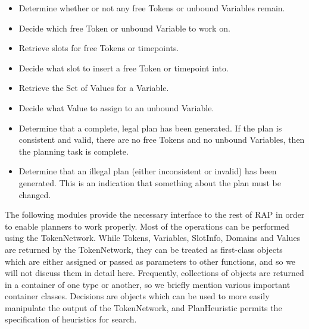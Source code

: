\begin{itemize}
    \item Determine whether or not any free Tokens or unbound Variables remain.
    \item Decide which free Token or unbound Variable to work on.
    \item Retrieve slots for free Tokens or timepoints.
    \item Decide what slot to insert a free Token or timepoint into.
    \item Retrieve the Set of Values for a Variable.
    \item Decide what Value to assign to an unbound Variable.
    \item Determine that a complete, legal plan has been generated.  If the plan is 
    consistent and valid, there are no free Tokens and no unbound Variables,
    then the planning task is complete.
    \item Determine that an illegal plan (either inconsistent or invalid) has been
    generated.  This is an indication that something about the plan must be changed.
\end{itemize}

The following modules provide the necessary interface to the rest of
RAP in order to enable planners to work properly.  Most of the
operations can be performed using the TokenNetwork.  While Tokens,
Variables, SlotInfo, Domains and Values are returned by the
TokenNetwork, they can be treated as first-class objects which are
either assigned or passed as parameters to other functions, and so we
will not discuss them in detail here.  Frequently, collections of
objects are returned in a container of one type or another, so we briefly
mention various important container classes.  Decisions 
are objects which can be used to more easily manipulate the output of
the TokenNetwork, and PlanHeuristic permits the specification of heuristics
for search.

